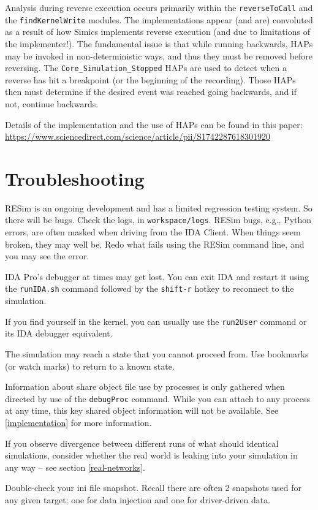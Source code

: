 \documentclass[titlepage]{article}
\begin{document}
Analysis during reverse execution occurs primarily within the {\tt reverseToCall} and the {\tt findKernelWrite} modules.  The implementations appear (and are) convoluted as
a result of how Simics implements reverse execution (and due to limitations of the implementer!).  The fundamental issue is that while running backwards, HAPs may be
invoked in non-deterministic ways, and thus they must be removed before reversing.  The {\tt Core\_Simulation\_Stopped} HAPs are used to detect when a reverse has
hit a breakpoint (or the beginning of the recording).  Those HAPs then must determine if the desired event was reached going backwards, and if not, continue backwards. 

Details of the implementation and the use of HAPs can be found in this paper: \url{https://www.sciencedirect.com/science/article/pii/S1742287618301920}

\section{Troubleshooting}
\label{troubleshooting}
RESim is an ongoing development and has a limited regression testing system.  So there will be bugs.
Check the logs, in {\tt workspace/logs}.  
RESim bugs, e.g., Python errors, are often masked when driving from the IDA Client.  When things seem broken, they
may well be.  Redo what fails using the RESim command line, and you may see the error.

IDA Pro's debugger at times may get lost.  You can exit IDA and restart it using the {\tt runIDA.sh} command followed by the
{\tt shift-r} hotkey to reconnect to the simulation.

If you find yourself in the kernel, you can usually use the {\tt run2User} command or its IDA debugger equivalent.

The simulation may reach a state that you cannot proceed from.  Use bookmarks (or watch marks) to return to a known state.

Information about share object file use by processes is only gathered when directed by use of the {\tt debugProc} command.
While you can attach to any process at any time, this key shared object information will not be available.  See \ref{implementation}
for more information.

If you observe divergence between different runs of what should identical simulations, consider whether the real world is leaking
into your simulation in any way -- see section \ref{real-networks}.

Double-check your ini file snapshot.  Recall there are often 2 snapshots used for any given target; one for data injection and one for 
driver-driven data.
\end{document}
